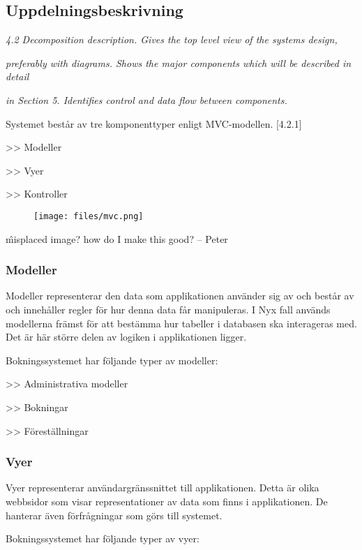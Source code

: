 \documentclass[a4paper, twoside, 11pt, titlepage]{article}
\begin{document}
	\subsection{Uppdelningsbeskrivning}


	\emph{4.2 Decomposition description. Gives the top level view of the systems design,}

	\emph{preferably with diagrams. Shows the major components which will be described in detail}

	\emph{in Section 5. Identifies control and data flow between components.}

	Systemet består av tre komponenttyper enligt MVC-modellen. [4.2.1]

	>> Modeller

	>> Vyer

	>> Kontroller

	\begin{figure}[ht] \centering \texttt{[image: files/mvc.png]} \end{figure} \FloatBarrier

	\^ misplaced image? how do I make this good? -- Peter

		\subsubsection{Modeller}


		Modeller representerar den data som applikationen använder sig av och består av och innehåller regler för hur denna data får manipuleras. I Nyx fall används modellerna främst för att bestämma hur tabeller i databasen ska interageras med. Det är här större delen av logiken i applikationen ligger.

		Bokningssystemet har följande typer av modeller:

		>> Administrativa modeller

		>> Bokningar

		>> Föreställningar

		\subsubsection{Vyer}


		Vyer representerar användargränssnittet till applikationen. Detta är olika webbsidor som visar representationer av data som finns i applikationen. De hanterar även förfrågningar som görs till systemet.

		Bokningssystemet har följande typer av vyer:
\end{document}
